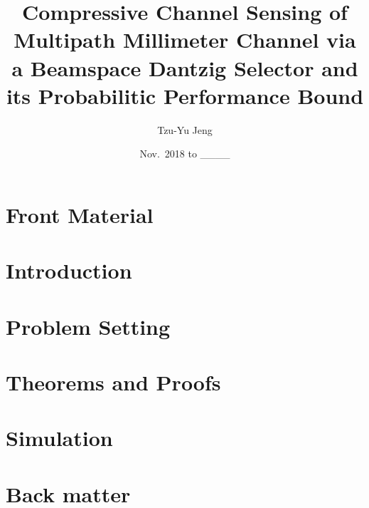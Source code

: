 \documentclass[12pt]{article}
\author{Tzu-Yu Jeng}
\date{Nov.\ 2018 to \_\_\_\_}
\title{Compressive Channel Sensing of Multipath Millimeter Channel via a Beamspace Dantzig Selector and its Probabilitic Performance Bound}
\begin{document}
\maketitle

\section{Front Material}



\section{Introduction}



\section{Problem Setting}



\section{Theorems and Proofs}



\section{Simulation}



\section{Back matter}


\end{document}
